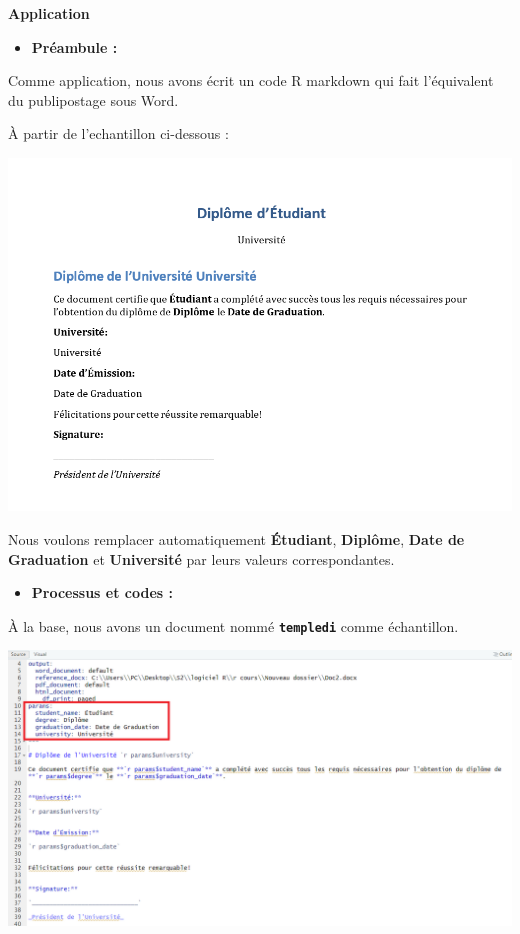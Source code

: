 \documentclass[
  12pt,
]{article}
\providecommand{\tightlist}{%
  \setlength{\itemsep}{0pt}\setlength{\parskip}{0pt}}
\begin{document}
\textbf{Application}

\begin{itemize}
\tightlist
\item
  \textbf{Préambule :}
\end{itemize}

Comme application, nous avons écrit un code R markdown qui fait
l'équivalent du publipostage sous Word.

À partir de l'echantillon ci-dessous :

\begin{center}\includegraphics[width=1\linewidth,height=1\textheight]{../Document_Rmarkdown/Images/Echantillon_publipostage} \end{center}

Nous voulons remplacer automatiquement \textbf{Étudiant},
\textbf{Diplôme}, \textbf{Date de Graduation} et \textbf{Université} par
leurs valeurs correspondantes.

\begin{itemize}
\tightlist
\item
  \textbf{Processus et codes :}
\end{itemize}

À la base, nous avons un document nommé \textbf{\texttt{templedi}} comme
échantillon.

\begin{center}\includegraphics[width=1\linewidth,height=1\textheight]{../Document_Rmarkdown/Images/templedi} \end{center}
\end{document}
